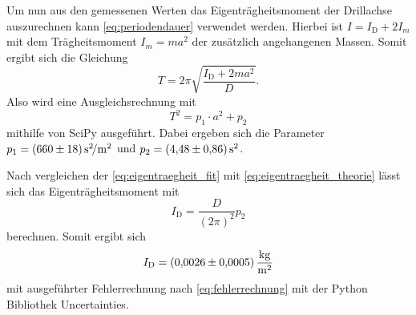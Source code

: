 Um nun aus den gemessenen Werten das Eigenträgheitsmoment der Drillachse auszurechnen kann \autoref{eq:periodendauer} verwendet werden. Hierbei ist $I=I_\text{D}+2I_m$ mit dem Trägheitsmoment $I_m=ma^2$ der zusätzlich angehangenen Massen. Somit ergibt sich die Gleichung
\begin{equation}
    T=2\pi \sqrt{\frac{I_\text{D}+2ma^2}{D}}.
    \label{eq:eigentraegheit_theorie}
\end{equation}
Also wird eine Ausgleichsrechnung mit
\begin{equation}
    T^2 = p_1 \cdot a^2 + p_2
    \label{eq:eigentraegheit_fit}
\end{equation}
mithilfe von SciPy ausgeführt.\cite{scipy} Dabei ergeben sich die Parameter $p_1=\SI{660+-18}{\second\squared\per\meter\squared}$ und $p_2=\SI{4.48+-0.86}{\second\squared}$. 

Nach vergleichen der \autoref{eq:eigentraegheit_fit} mit \autoref{eq:eigentraegheit_theorie} lässt sich das Eigenträgheitsmoment mit
\begin{equation}
    I_\text{D} = \frac{D}{(2\pi)^2}p_2
\end{equation}
berechnen. Somit ergibt sich
\begin{equation}
    I_\text{D} = \SI{0.0026+-0.0005}{\kilo\gram\per\meter\squared}
\end{equation}
mit ausgeführter Fehlerrechnung nach \autoref{eq:fehlerrechnung} mit der Python Bibliothek Uncertainties.\cite{uncertainties}